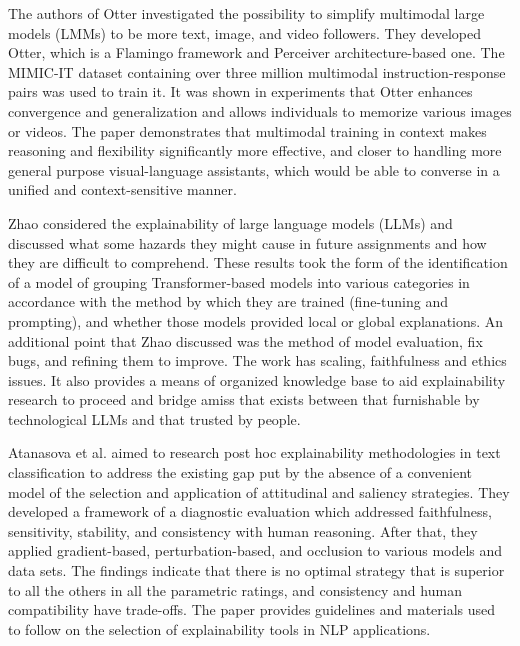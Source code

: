 \vspace{1em} 
The authors of Otter investigated the possibility to simplify multimodal large models (LMMs) to be more text, image, and video followers\cite{Li2023Otter}. They developed Otter, which is a Flamingo framework and Perceiver architecture-based one. The MIMIC-IT dataset containing over three million multimodal instruction-response pairs was used to train it. It was shown in experiments that Otter enhances convergence and generalization and allows individuals to memorize various images or videos. The paper demonstrates that multimodal training in context makes reasoning and flexibility significantly more effective, and closer to handling more general purpose visual-language assistants, which would be able to converse in a unified and context-sensitive manner.

\vspace{1em} 
Zhao considered the explainability of large language models (LLMs) and discussed what some hazards they might cause in future assignments and how they are difficult to comprehend\cite{Zhao2024}. These results took the form of the identification of a model of grouping Transformer-based models into various categories in accordance with the method by which they are trained (fine-tuning and prompting), and whether those models provided local or global explanations. An additional point that Zhao discussed was the method of model evaluation, fix bugs, and refining them to improve. The work has scaling, faithfulness and ethics issues. It also provides a means of organized knowledge base to aid explainability research to proceed and bridge amiss that exists between that furnishable by technological LLMs and that trusted by people.


\vspace{1em} 



Atanasova et al. aimed to research post hoc explainability methodologies in text classification to address the existing gap put by the absence of a convenient model of the selection and application of attitudinal and saliency strategies\cite{Atanasova2024}. They developed a framework of a diagnostic evaluation which addressed faithfulness, sensitivity, stability, and consistency with human reasoning. After that, they applied gradient-based, perturbation-based, and occlusion to various models and data sets. The findings indicate that there is no optimal strategy that is superior to all the others in all the parametric ratings, and consistency and human compatibility have trade-offs. The paper provides guidelines and materials used to follow on the selection of explainability tools in NLP applications.

